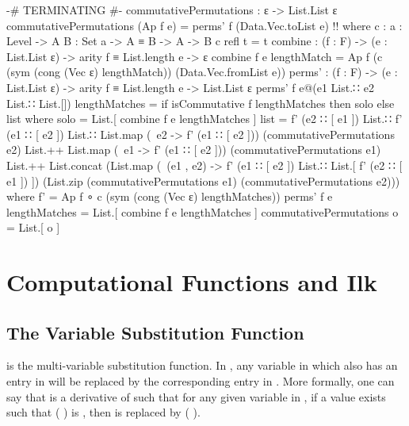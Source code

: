 \documentclass{report}
\begin{document}
\begin{code}
{-# TERMINATING #-}
commutativePermutations : ε -> List.List ε
commutativePermutations (Ap f e) = perms' f (Data.Vec.toList e) {!!}
  where
  c : {a : Level} -> {A B : Set a} -> A ≡ B -> A -> B
  c refl t = t
  combine : (f : F) -> (e : List.List ε) -> arity f ≡ List.length e -> ε
  combine f e lengthMatch = Ap f (c (sym (cong (Vec ε) lengthMatch))
                                    (Data.Vec.fromList e))
  perms' : (f : F) -> (e : List.List ε) -> arity f ≡ List.length e -> List.List ε
  perms' f e@(e1 List.∷ e2 List.∷ List.[]) lengthMatches =
    if isCommutative f lengthMatches then solo else list
    where
    solo = List.[ combine f e lengthMatches ]
    list =
      f' (e2 ∷ [ e1 ]) List.∷ f' (e1 ∷ [ e2 ]) List.∷
      List.map (\ e2 -> f' (e1 ∷ [ e2 ])) (commutativePermutations e2) List.++
      List.map (\ e1 -> f' (e1 ∷ [ e2 ])) (commutativePermutations e1) List.++
      List.concat (List.map (\ (e1 , e2) -> f' (e1 ∷ [ e2 ]) List.∷
                                            List.[ f' (e2 ∷ [ e1 ]) ])
                            (List.zip (commutativePermutations e1)
                                      (commutativePermutations e2)))
      where f' = Ap f ∘ c (sym (cong (Vec ε) lengthMatches))
  perms' f e lengthMatches = List.[ combine f e lengthMatches ]
commutativePermutations o = List.[ o ]
\end{code}

\chapter{Computational Functions and Ilk}

\section{The Variable Substitution Function}
 is the multi-variable substitution function.  In   , any variable in  which also has an entry in  will be replaced by the corresponding  entry in .  More formally, one can say that    is a derivative of  such that for any given variable  in , if a value  exists such that  \AgdaSymbol(  \AgdaSymbol) is , then  is replaced by  \AgdaSymbol(  \AgdaSymbol).
\end{document}
